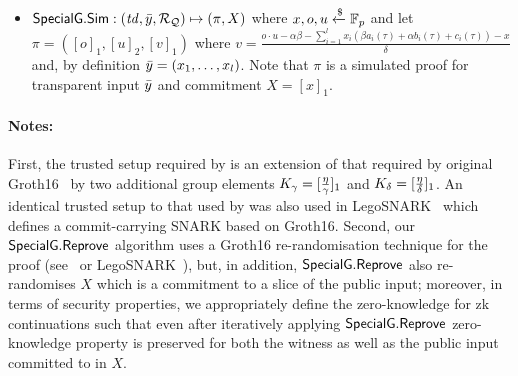\begin{definition}
\begin{itemize}
\item ${\mathsf{SpecialG}}.{\mathsf{Sim}}: (\mathit{td}, \bar{y}, \mathcal{R}_{\mathcal{Q}}) \mapsto (\pi, X)$ where $x, o, u \xleftarrow {\$} \mathbb{F}_p$ and let \\
$\pi = ([o]_1, [u]_2, [v]_1)$ where $v = \frac{o\cdot u - \alpha \beta - \sum_{i=1}^{l} x_i (\beta a_i(\tau)+ \alpha b_i(\tau)+ c_i(\tau))- x}{\delta}  $ and, 
by definition $\bar{y} = (x_1, \ldots, x_l)$. Note that $\pi$ is a simulated proof for transparent input $\bar{y}$ and commitment $X = [x]_1$.
\end{itemize} 
\end{definition}

\noindent \paragraph{Notes:} First, the trusted setup required by \SpecialG is 
an extension of that required by original Groth16~\cite{Groth16} by two additional 
group elements $K_{\gamma} = [\frac{\eta}{\gamma}]_1$ and $K_{\delta} = [\frac{\eta}{\delta}]_1$. 
An identical trusted setup to that used by \SpecialG was also used in LegoSNARK~\cite[Fig.~22]{LegoSNARK} which defines 
a commit-carrying SNARK based on Groth16. Second, our ${\mathsf{SpecialG}}.{\mathsf{Reprove}}$ algorithm uses a Groth16 re-randomisation 
technique for the proof (see~\cite[Fig.~1]{RandomizationGroth16} or LegoSNARK~\cite[Fig.~22]{LegoSNARK}), 
but, in addition, ${\mathsf{SpecialG}}.{\mathsf{Reprove}}$ also re-randomises $X$ which is a commitment to a slice of the public input; moreover, in terms of security 
properties, we appropriately define the zero-knowledge for zk continuations such that even after iteratively applying 
${\mathsf{SpecialG}}.{\mathsf{Reprove}}$ zero-knowledge property is preserved for both the witness as well as the public input committed to in $X$.  \\



